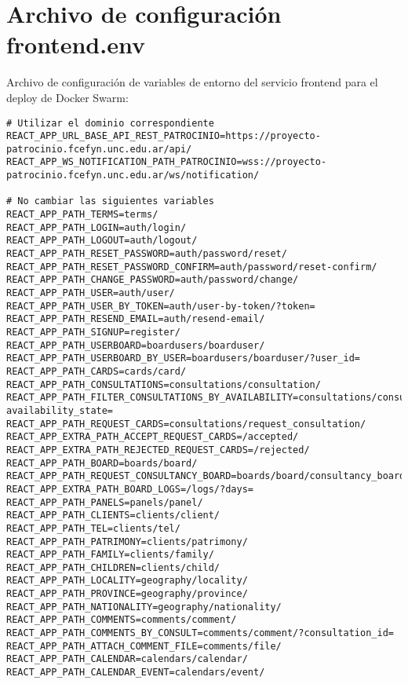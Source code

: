 \section{Archivo de configuración \textbf{frontend.env}}\label{sec:anexo:configfile-frontend-env}
Archivo de configuración de variables de entorno del servicio frontend para el deploy de Docker Swarm:

\begin{lstlisting}[caption={Archivo de Configuración frontend.env}, label={cod:frontend.env}, captionpos=b]
# Utilizar el dominio correspondiente
REACT_APP_URL_BASE_API_REST_PATROCINIO=https://proyecto-patrocinio.fcefyn.unc.edu.ar/api/
REACT_APP_WS_NOTIFICATION_PATH_PATROCINIO=wss://proyecto-patrocinio.fcefyn.unc.edu.ar/ws/notification/

# No cambiar las siguientes variables
REACT_APP_PATH_TERMS=terms/
REACT_APP_PATH_LOGIN=auth/login/
REACT_APP_PATH_LOGOUT=auth/logout/
REACT_APP_PATH_RESET_PASSWORD=auth/password/reset/
REACT_APP_PATH_RESET_PASSWORD_CONFIRM=auth/password/reset-confirm/
REACT_APP_PATH_CHANGE_PASSWORD=auth/password/change/
REACT_APP_PATH_USER=auth/user/
REACT_APP_PATH_USER_BY_TOKEN=auth/user-by-token/?token=
REACT_APP_PATH_RESEND_EMAIL=auth/resend-email/
REACT_APP_PATH_SIGNUP=register/
REACT_APP_PATH_USERBOARD=boardusers/boarduser/
REACT_APP_PATH_USERBOARD_BY_USER=boardusers/boarduser/?user_id=
REACT_APP_PATH_CARDS=cards/card/
REACT_APP_PATH_CONSULTATIONS=consultations/consultation/
REACT_APP_PATH_FILTER_CONSULTATIONS_BY_AVAILABILITY=consultations/consultation/?availability_state=
REACT_APP_PATH_REQUEST_CARDS=consultations/request_consultation/
REACT_APP_EXTRA_PATH_ACCEPT_REQUEST_CARDS=/accepted/
REACT_APP_EXTRA_PATH_REJECTED_REQUEST_CARDS=/rejected/
REACT_APP_PATH_BOARD=boards/board/
REACT_APP_PATH_REQUEST_CONSULTANCY_BOARD=boards/board/consultancy_board/
REACT_APP_EXTRA_PATH_BOARD_LOGS=/logs/?days=
REACT_APP_PATH_PANELS=panels/panel/
REACT_APP_PATH_CLIENTS=clients/client/
REACT_APP_PATH_TEL=clients/tel/
REACT_APP_PATH_PATRIMONY=clients/patrimony/
REACT_APP_PATH_FAMILY=clients/family/
REACT_APP_PATH_CHILDREN=clients/child/
REACT_APP_PATH_LOCALITY=geography/locality/
REACT_APP_PATH_PROVINCE=geography/province/
REACT_APP_PATH_NATIONALITY=geography/nationality/
REACT_APP_PATH_COMMENTS=comments/comment/
REACT_APP_PATH_COMMENTS_BY_CONSULT=comments/comment/?consultation_id=
REACT_APP_PATH_ATTACH_COMMENT_FILE=comments/file/
REACT_APP_PATH_CALENDAR=calendars/calendar/
REACT_APP_PATH_CALENDAR_EVENT=calendars/event/
\end{lstlisting}



